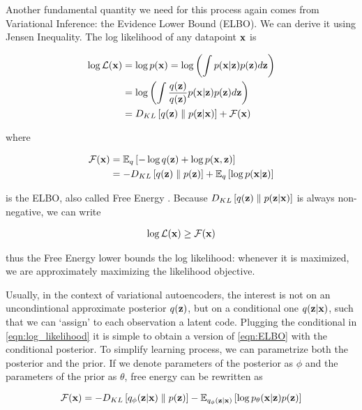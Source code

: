 \documentclass[12pt]{article}
\begin{document}
Another fundamental quantity we need for this process again comes from Variational Inference: the Evidence Lower Bound (ELBO). We can derive it using Jensen Inequality. The log likelihood of any datapoint \(\textbf{x}\) is 

\begin{align}
    \label{eqn:log_likelihood}
    \log \mathcal{L}(\textbf{x}) &= \log p(\textbf{x}) = \log \left( \int p(\textbf{x}|\textbf{z})p(\textbf{z})d\textbf{z} \right) \nonumber \\
    &= \log \left( \int \frac{q (\textbf{z})}{q (\textbf{z})} p(\textbf{x}|\textbf{z})p(\textbf{z})d\textbf{z} \right) \nonumber \\
    &= D_{KL}\left[ q (\textbf{z}) \parallel p(\textbf{z}|\textbf{x}) \right] + \mathcal{F}(\textbf{x}) 
\end{align}

where

\begin{align}
    \label{eqn:ELBO}
    \mathcal{F}(\textbf{x}) &= \mathbb{E}_{q } \left[ -\log q (\textbf{z}) + \log p(\textbf{x},\textbf{z})\right] \nonumber \\
    &= -D_{KL}\left[ q (\textbf{z}) \parallel p(\textbf{z}) \right] + \mathbb{E}_{q } \left[ \log p(\textbf{x}|\textbf{z})\right]
\end{align}

is the ELBO, also called Free Energy \cite{pmlr-v32-rezende14}.
Because \(D_{KL}\left[ q(\textbf{z}) \parallel p(\textbf{z}|\textbf{x}) \right]\) is always non-negative, we can write

\begin{align}
    \log \mathcal{L}(\textbf{x}) \geq \mathcal{F}(\textbf{x})
\end{align}

thus the Free Energy lower bounds the log likelihood: whenever it is maximized, we are approximately maximizing the likelihood objective.


Usually, in the context of variational autoencoders, the interest is not on an uncondintional approximate posterior \(q(\textbf{z})\), but on a conditional one \(q(\textbf{z}|\textbf{x})\), such that we can `assign' to each observation a latent code. Plugging the conditional in \eqref{eqn:log_likelihood} it is simple to obtain a version of \eqref{eqn:ELBO} with the conditional posterior. To simplify learning process, we can parametrize both the posterior and the prior. If we denote parameters of the posterior as \(\phi\) and the parameters of the prior as \(\theta\), free energy can be rewritten as

\begin{equation}
    \label{eqn:ELBO}
    \mathcal{F}(\textbf{x}) = -D_{KL}\left[ q_{\phi}(\textbf{z}|\textbf{x}) \parallel p(\textbf{z}) \right] - \mathbb{E}_{q_{\phi}(\textbf{z}|\textbf{x})} \left[ \log p_{\theta}(\textbf{x}|\textbf{z})p(\textbf{z}) \right]
\end{equation}
\end{document}
